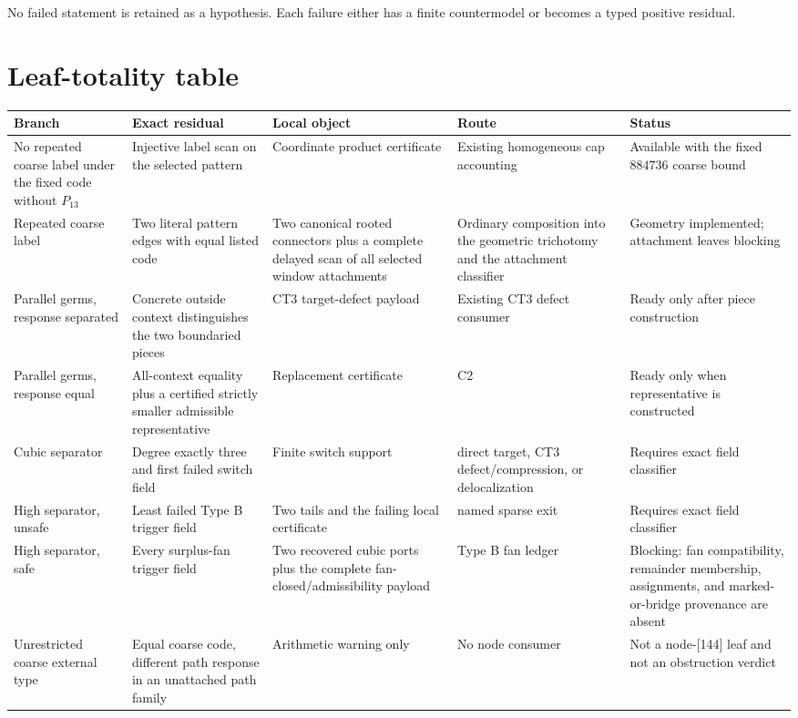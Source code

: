 \documentclass[11pt]{article}
\begin{document}
No failed statement is retained as a hypothesis.  Each failure either has a
finite countermodel or becomes a typed positive residual.

\section{Leaf-totality table}

\begin{longtable}{>{\raggedright\arraybackslash}p{}
                  >{\raggedright\arraybackslash}p{}
                  >{\raggedright\arraybackslash}p{}
                  >{\raggedright\arraybackslash}p{}
                  >{\raggedright\arraybackslash}p{}}
\toprule
Branch & Exact residual & Local object & Route & Status \\
\midrule
No repeated coarse label under the fixed code without $P_{13}$ & Injective
label scan on the selected pattern & Coordinate product certificate & Existing
homogeneous cap accounting & Available with the fixed $884736$ coarse bound \\
Repeated coarse label & Two literal pattern edges with equal listed code &
Two canonical rooted connectors plus a complete delayed scan of all selected
window attachments & Ordinary composition into the geometric trichotomy and
the attachment classifier & Geometry implemented; attachment leaves blocking \\
Parallel germs, response separated & Concrete outside context distinguishes
the two boundaried pieces & CT3 target-defect payload & Existing CT3 defect
consumer & Ready only after piece construction \\
Parallel germs, response equal & All-context equality plus a certified
strictly smaller admissible representative & Replacement certificate & C2 &
Ready only when representative is constructed \\
Cubic separator & Degree exactly three and first failed switch field & Finite
switch support & direct target, CT3 defect/compression, or delocalization &
Requires exact field classifier \\
High separator, unsafe & Least failed Type B trigger field & Two tails and
the failing local certificate & named sparse exit & Requires exact field
classifier \\
High separator, safe & Every surplus-fan trigger field & Two recovered cubic
ports plus the complete fan-closed/admissibility payload & Type B fan ledger &
Blocking: fan compatibility, remainder membership, assignments, and
marked-or-bridge provenance are absent \\
Unrestricted coarse external type & Equal coarse code, different path
response in an unattached path family & Arithmetic warning only & No node
consumer & Not a node-[144] leaf and not an obstruction verdict \\
\bottomrule
\end{longtable}
\end{document}
